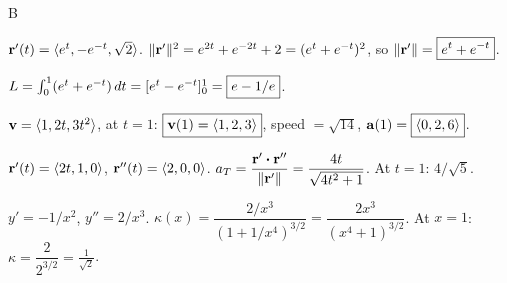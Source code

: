 \documentclass[11pt]{article}
\begin{document}
\begin{answers}{B}
\item $\mathbf{r}'(t) = \langle e^t, -e^{-t}, \sqrt 2\rangle$. $\|\mathbf{r}'\|^2 = e^{2t} + e^{-2t} + 2 = (e^t + e^{-t})^2$, so $\|\mathbf{r}'\| = \boxed{e^t + e^{-t}}$.
\item $L = \int_0^1 (e^t + e^{-t}) \,dt = [e^t - e^{-t}]_0^1 = \boxed{e - 1/e}$.
\item $\mathbf{v} = \langle 1, 2t, 3t^2\rangle$, at $t=1$: $\boxed{\mathbf{v}(1) = \langle 1,2,3\rangle}$, speed $= \sqrt{14}$, $\mathbf{a}(1) = \boxed{\langle 0,2,6\rangle}$.
\item $\mathbf{r}'(t) = \langle 2t, 1, 0\rangle$, $\mathbf{r}''(t) = \langle 2, 0, 0\rangle$. $a_T = \dfrac{\mathbf{r}'\boldsymbol\cdot\mathbf{r}''}{\|\mathbf{r}'\|} = \dfrac{4t}{\sqrt{4t^2 + 1}}$. At $t=1$: $\boxed{4/\sqrt 5}$.
\item $y' = -1/x^2$, $y'' = 2/x^3$. $\kappa(x) = \dfrac{2/x^3}{(1 + 1/x^4)^{3/2}} = \dfrac{2 x^3}{(x^4 + 1)^{3/2}}$. At $x = 1$: $\kappa = \dfrac{2}{2^{3/2}} = \boxed{\tfrac{1}{\sqrt 2}}$.
\end{answers}
\end{document}
